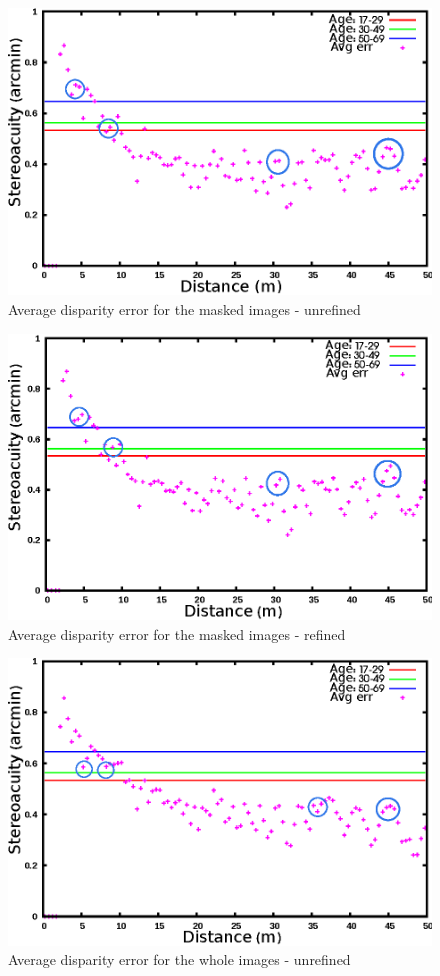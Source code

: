 \begin{figure}[H]
\centering
\includegraphics[scale=0.95]{adcenmsk3NoLRmrk}
\caption{Average disparity error for the masked images - unrefined}
\label{fig:adcmnoLR}
\end{figure} 
\begin{figure}[H]
\centering
\includegraphics[scale=0.95]{adcenmsk3mrk}
\caption{Average disparity error for the masked images - refined}
\label{fig:adcm3mrk}
\end{figure} 
\begin{figure}[H]
\centering
\includegraphics[scale=0.95]{adcenfull3NoLRmrk}
\caption{Average disparity error for the whole images - unrefined}
\label{fig:adcfnoLR}
\end{figure} 
